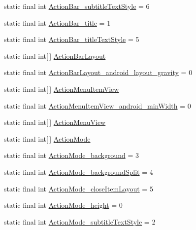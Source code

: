 \begin{DoxyCompactItemize}
\item 
static final int \hyperlink{classcheck_1_1test_1_1_r_1_1styleable_ad8f744ed2471b251e30b55ec1193a048}{Action\+Bar\+\_\+subtitle\+Text\+Style} = 6
\item 
static final int \hyperlink{classcheck_1_1test_1_1_r_1_1styleable_a9f68b2ef978d31096a2c231b92d807bc}{Action\+Bar\+\_\+title} = 1
\item 
static final int \hyperlink{classcheck_1_1test_1_1_r_1_1styleable_a35a91b9015c202578382afcbaba1eab6}{Action\+Bar\+\_\+title\+Text\+Style} = 5
\item 
static final int\mbox{[}$\,$\mbox{]} \hyperlink{classcheck_1_1test_1_1_r_1_1styleable_a8971aa624f5e375a92c516f616a8e96f}{Action\+Bar\+Layout}
\item 
static final int \hyperlink{classcheck_1_1test_1_1_r_1_1styleable_a3612dfcddc55dfc324a442784c10f411}{Action\+Bar\+Layout\+\_\+android\+\_\+layout\+\_\+gravity} = 0
\item 
static final int\mbox{[}$\,$\mbox{]} \hyperlink{classcheck_1_1test_1_1_r_1_1styleable_af9bcde1ea657ba5e365b9244857ff747}{Action\+Menu\+Item\+View}
\item 
static final int \hyperlink{classcheck_1_1test_1_1_r_1_1styleable_a87c981bf978b7f6f0732aa8d94620c0e}{Action\+Menu\+Item\+View\+\_\+android\+\_\+min\+Width} = 0
\item 
static final int\mbox{[}$\,$\mbox{]} \hyperlink{classcheck_1_1test_1_1_r_1_1styleable_ace11af9ebf7e91da67085b7da4b26f4e}{Action\+Menu\+View}
\item 
static final int\mbox{[}$\,$\mbox{]} \hyperlink{classcheck_1_1test_1_1_r_1_1styleable_a06d2fd2de1e471a432f3e49eea7b8015}{Action\+Mode}
\item 
static final int \hyperlink{classcheck_1_1test_1_1_r_1_1styleable_a2bc48f11c96ca1baa661fbf035348f1b}{Action\+Mode\+\_\+background} = 3
\item 
static final int \hyperlink{classcheck_1_1test_1_1_r_1_1styleable_a34087089909e4f53d9a05b693bbd6717}{Action\+Mode\+\_\+background\+Split} = 4
\item 
static final int \hyperlink{classcheck_1_1test_1_1_r_1_1styleable_a6ac0eea3f70ecdbef1e54a263fcd19f9}{Action\+Mode\+\_\+close\+Item\+Layout} = 5
\item 
static final int \hyperlink{classcheck_1_1test_1_1_r_1_1styleable_a2c8d25c4f35e83ab690e40cb3a840c72}{Action\+Mode\+\_\+height} = 0
\item 
static final int \hyperlink{classcheck_1_1test_1_1_r_1_1styleable_a4c146f8a39f38c5f2aa884f74d24b896}{Action\+Mode\+\_\+subtitle\+Text\+Style} = 2

\end{DoxyCompactItemize}
